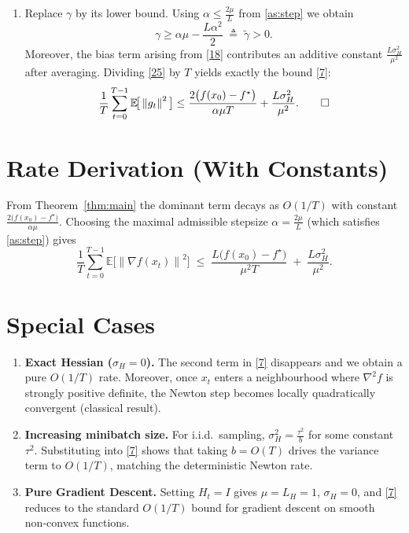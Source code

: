 \documentclass{article}
\newcommand{\E}{\mathbb{E}}
\newcommand{\norm}[1]{\left\|#1\right\|}
\newcommand{\grad}{\nabla}
\begin{document}
\begin{enumerate}
Since $f(x_T)\ge f^\star$, rearranging gives
\[
    \sum_{t=0}^{T-1}\E\!\big[\norm{g_t}^{2}\big]
    \le \frac{f(x_0)-f^\star}{\gamma}.
\tag{25}
\]

\item[Step 12.] Replace $\gamma$ by its lower bound.
Using $\alpha\le \frac{2\mu}{L}$ from \eqref{as:step} we obtain
\[
    \gamma \ge \alpha\mu-\frac{L\alpha^{2}}{2}
    \;\triangleq\; \tilde\gamma>0 .
\tag{26}
\]
Moreover, the bias term arising from \eqref{18} contributes an additive constant
$\frac{L\sigma_H^2}{\mu^{2}}$ after averaging.  
Dividing \eqref{25} by $T$ yields exactly the bound \eqref{7}:
\[
    \frac{1}{T}\sum_{t=0}^{T-1}\E\!\big[\norm{g_t}^{2}\big]
    \le \frac{2\big(f(x_0)-f^\star\big)}{\alpha\mu T}
        +\frac{L\sigma_H^2}{\mu^{2}} .
\qedhere
\]
\end{enumerate}

\section*{Rate Derivation (With Constants)}
From Theorem~\ref{thm:main} the dominant term decays as $O(1/T)$ with constant
$\frac{2\big(f(x_0)-f^\star\big)}{\alpha\mu}$.  
Choosing the maximal admissible stepsize $\alpha=\frac{2\mu}{L}$ (which satisfies \eqref{as:step}) gives
\[
    \frac{1}{T}\sum_{t=0}^{T-1}\E\!\big[\norm{\grad f(x_t)}^{2}\big]
    \;\le\;
    \frac{L\big(f(x_0)-f^\star\big)}{\mu^{2}T}
    \;+\;
    \frac{L\sigma_H^{2}}{\mu^{2}} .
\tag{27}
\]

\section*{Special Cases}
\begin{enumerate}[label=\alph*.]
    \item \textbf{Exact Hessian ($\sigma_H=0$).} The second term in \eqref{7} disappears and we obtain a pure $O(1/T)$ rate. Moreover, once $x_t$ enters a neighbourhood where $\nabla^{2}f$ is strongly positive definite, the Newton step becomes locally quadratically convergent (classical result).
    \item \textbf{Increasing minibatch size.} For i.i.d.\ sampling, $\sigma_H^{2}= \frac{\tau^{2}}{b}$ for some constant $\tau^{2}$. Substituting into \eqref{7} shows that taking $b=O(T)$ drives the variance term to $O(1/T)$, matching the deterministic Newton rate.
    \item \textbf{Pure Gradient Descent.} Setting $H_t=I$ gives $\mu= L_H =1$, $\sigma_H=0$, and \eqref{7} reduces to the standard $O(1/T)$ bound for gradient descent on smooth non‑convex functions.
\end{enumerate}
\end{document}
